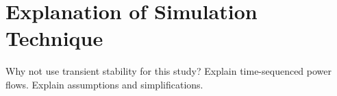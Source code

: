 \section{Explanation of Simulation Technique}
Why not use transient stability for this study?
Explain time-sequenced power flows.
Explain assumptions and simplifications.